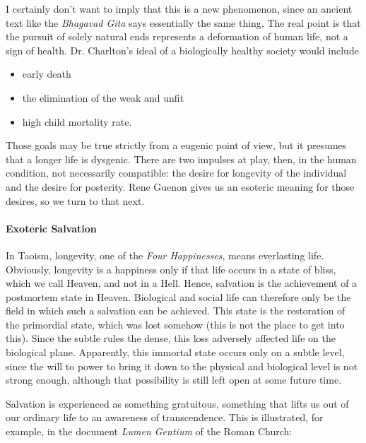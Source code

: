 I certainly don't want to imply that this is a new phenomenon, since an ancient text like the \emph{Bhagavad Gita} says essentially the same thing. The real point is that the pursuit of solely natural ends represents a deformation of human life, not a sign of health. Dr. Charlton's ideal of a biologically healthy society would include

\begin{itemize}


\item early death

\item the elimination of the weak and unfit

\item high child mortality rate.
\end{itemize}


Those goals may be true strictly from a eugenic point of view, but it presumes that a longer life is dysgenic. There are two impulses at play, then, in the human condition, not necessarily compatible: the desire for longevity of the individual and the desire for posterity. Rene Guenon gives us an esoteric meaning for those desires, so we turn to that next.

\paragraph{Exoteric Salvation}


In Taoism, longevity, one of the \emph{Four Happinesses}, means everlasting life. Obviously, longevity is a happiness only if that life occurs in a state of bliss, which we call Heaven, and not in a Hell. Hence, salvation is the achievement of a postmortem state in Heaven. Biological and social life can therefore only be the field in which such a salvation can be achieved. This state is the restoration of the primordial state, which was lost somehow (this is not the place to get into this). Since the subtle rules the dense, this loss adversely affected life on the biological plane. Apparently, this immortal state occurs only on a subtle level, since the will to power to bring it down to the physical and biological level is not strong enough, although that possibility is still left open at some future time.

Salvation is experienced as something gratuitous, something that lifts us out of our ordinary life to an awareness of transcendence. This is illustrated, for example, in the document \emph{Lumen Gentium} of the Roman Church:

